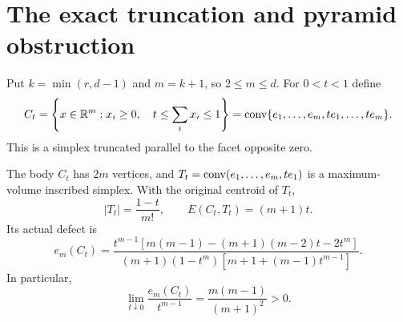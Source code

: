 \section{The exact truncation and pyramid obstruction}
\label{sec:sharpness}
Put $k=\min(r,d-1)$ and $m=k+1$, so $2\le m\le d$. For $0<t<1$ define
\begin{equation}\label{eq:core}
 C_t=\left\{x\in\mathbb R^m:x_i\ge0,\quad t\le\sum_i x_i\le1\right\}
     =\operatorname{conv}\{e_1,\ldots,e_m,te_1,\ldots,te_m\}.
\end{equation}
This is a simplex truncated parallel to the facet opposite zero.

\begin{proposition}\label{prop:core}
The body $C_t$ has $2m$ vertices, and
$T_t=\operatorname{conv}(e_1,\ldots,e_m,te_1)$ is a maximum-volume inscribed simplex.
With the original centroid of $T_t$,
\begin{equation}\label{eq:coreE}
 |T_t|=\frac{1-t}{m!},\qquad E(C_t,T_t)=(m+1)t.
\end{equation}
Its actual defect is
\begin{equation}\label{eq:coree}
 e_m(C_t)=
 \frac{t^{m-1}[m(m-1)-(m+1)(m-2)t-2t^m]}
 {(m+1)(1-t^m)[m+1+(m-1)t^{m-1}]}.
\end{equation}
In particular,
\begin{equation}\label{eq:corelimit}
 \lim_{t\downarrow0}\frac{e_m(C_t)}{t^{m-1}}
 =\frac{m(m-1)}{(m+1)^2}>0.
\end{equation}
\end{proposition}
